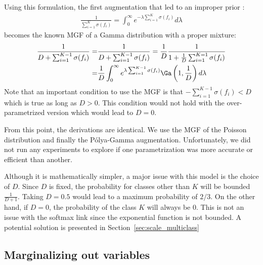 Using this formulation, the first augmentation that led to an improper prior :
\begin{align*}
    \frac{1}{ \sum_{i=1}^{K} \sigma(f_i)} = \int_0^\infty e^{-\lambda  \sum_{i=1}^{K} \sigma(f_i)}d\lambda
\end{align*}
becomes the known \ac{MGF} of a Gamma distribution with a proper mixture:
\begin{align*}
    \frac{1}{D + \sum_{i=1}^{K-1} \sigma(f_i)} =& \frac{1}{D + \sum_{i=1}^{K-1} \sigma(f_i)} = \frac{1}{D}\frac{1}{1+\frac{1}{D}\sum_{i=1}^{K=1}\sigma(f_i)}\\
    =& \frac{1}{D}\int_0^\infty e^{\lambda \sum_{i=1}^{K-1} \sigma(f_i)}\Ga \left(1, \frac{1}{D}\right)d\lambda
\end{align*}
Note that an important condition to use the \ac{MGF} is that $-\sum_{i=1}^{K-1} \sigma(f_i) < D$ which is true as long as $D > 0$.
This condition would not hold with the over-parametrized version which would lead to $D=0$.

From this point, the derivations are identical.
We use the \ac{MGF} of the Poisson distribution and finally the P\'olya-Gamma augmentation.
Unfortunately, we did not run any experiments to explore if one parametrization was more accurate or efficient than another.

Although it is mathematically simpler, a major issue with this model is the choice of $D$.
Since $D$ is fixed, the probability for classes other than $K$ will be bounded $\frac{1}{D + 1}$.
Taking $D=0.5$ would lead to a maximum probability of $2/3$.
On the other hand, if $D=0$, the probability of the class $K$ will always be $0$.
This is not an issue with the softmax link since the exponential function is not bounded.
A potential solution is presented in Section~\ref{sec:scale_multiclass}

\subsection{Marginalizing out variables}

